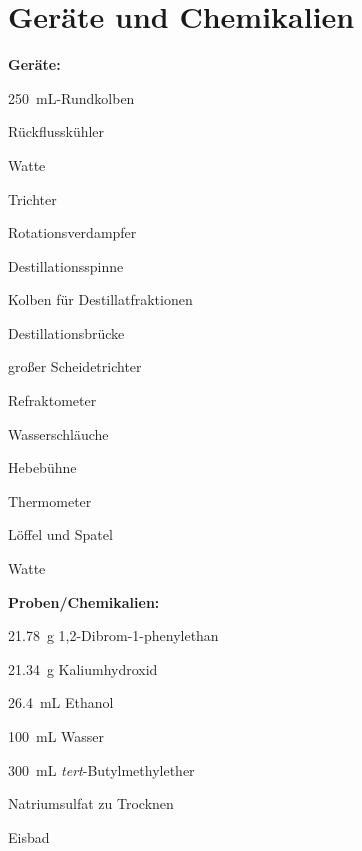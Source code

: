 \section{Geräte und Chemikalien}
\label{sec:geraete}

\textbf{Geräte:}
\begin{itemize}
	\begin{minipage}{0.45\textwidth}
		\item \SI{250}{\milli \liter}-Rundkolben 
		\item Rückflusskühler
		\item Watte
		\item Trichter
		\item Rotationsverdampfer
		\item Destillationsspinne
		\item Kolben für Destillatfraktionen
	\end{minipage}
	\hfill
	\begin{minipage}{0.45\textwidth}
		\item Destillationsbrücke
		\item großer Scheidetrichter
		\item Refraktometer
		\item Wasserschläuche
		\item Hebebühne
		\item Thermometer
		\item Löffel und Spatel
		\item Watte
	\end{minipage}
\end{itemize}

\newpage

\textbf{Proben/Chemikalien:}
\begin{itemize}
	\begin{minipage}{0.55 \textwidth}
		\item \SI{21,78}{\gram} 1,2-Dibrom-1-phenylethan
		\item \SI{21,34}{\gram} Kaliumhydroxid
		\item \SI{26,4}{\milli \liter} Ethanol
	
	\end{minipage}
\begin{minipage}{0.35 \textwidth}
		\item \SI{100}{\milli \liter} Wasser
	\item \SI{300}{\milli \liter} \textit{tert}-Butylmethylether
	\item Natriumsulfat zu Trocknen
	\item Eisbad
\end{minipage}
\end{itemize}




